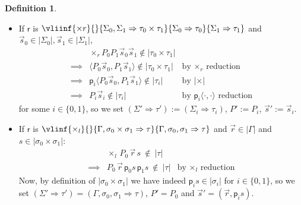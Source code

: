 \documentclass[10pt,a4paper]{amsart}
\theoremstyle{plain}
\theoremstyle{definition}
\newtheorem{definition}[definition]{Definition}
\theoremstyle{plain}
\theoremstyle{definition} %
\renewcommand{\succ}{\mathsf s}
\newcommand{\numeral}[1]{\underline{#1}}
\newcommand{\nat}{\mathit{N}}
\newcommand{\N}{\nat} %
\newcommand{\seqar}{\Rightarrow}
\newcommand{\Ncnd}{\lr \N'}
\newcommand{\infrule}{\mathsf{r}}
\newcommand{\rrule}{\infrule} %
\newcommand{\pair}[2]{\langle #1,#2\rangle}
\newcommand{\lr}[1]{#1_l}
\newcommand{\rr}[1]{#1_r}
\newcommand{\proj}[1]{\mathsf{p}_{#1}}
\newcommand{\der}{P}
\newcommand{\hr}[1]{|#1|}
\begin{document}
\begin{definition}
\begin{itemize}
Otherwise if $n= n'+1$ then,
\[
\begin{array}{rll}
     & \Ncnd \der_0 \der_1 \vec s s \, \notin \hr \tau \\
     \implies & \Ncnd \der_0  \der_1 \vec s  (\succ \numeral n') \, \notin \hr \tau & \text{by closure under conversion} \\
     \implies & \der_1  \vec s \numeral n' \, \notin \hr \tau & \text{by $\Ncnd$ reduction}
\end{array}
\]
so we set $(\Sigma'\seqar \tau'):= (\Sigma_0, \nat \seqar \tau)$, $\der':= \der_1$, $\vec s' := (\vec s,\numeral n')$.
        \item If $\rrule$ is
        \(
        \vliinf{\times r }{}{\Sigma_0, \Sigma_1 \seqar \tau_0 \times \tau_1}{\Sigma_0 \seqar \tau_0}{\Sigma_1 \seqar \tau_1}
        \)
        and $\vec s_0 \in \hr{\Sigma_0}, \vec s_1 \in \hr{\Sigma_1}$,
        \[
        \begin{array}{rll}
        & {\rr \times} {\der_0}{\der_1}\vec s_0 \vec s_1 \notin \hr{\tau_0\times \tau_1} & 
        \\ 
        \implies & \pair{\der_0\vec s_0}{\der_1\vec s_1} \notin\hr{\tau_0\times \tau_1} & \text{by $\rr\times$ reduction} \\
        \implies & \proj i \pair{\der_0\vec s_0}{\der_1\vec s_1}  \notin \hr{\tau_i} & \text{by $\hr{\times}$} \\
        \implies & {\der_i}\vec s_i \notin \hr{\tau_i} & \text{by {$\proj i \pair{\cdot}{\cdot}$ reduction}}
        \end{array}
        \]
        for some $i\in \{0,1\}$,
        so we set $(\Sigma' \seqar \tau') := (\Sigma_i \seqar \tau_i)$, $\der' := \der_i$, $\vec s' := \vec s_i$.
    \item If $\rrule$ is $\vlinf{  {\lr \times}}{}{\Gamma, \sigma_0 \times \sigma_1 \seqar \tau  }{\Gamma, \sigma_0,\sigma_1 \seqar \tau}$ and $\vec r \in \hr{\Gamma}$ and $s \in \hr{\sigma_0 \times \sigma_1}$:
    \[
    \begin{array}{rll}
        & {\lr\times }\,  {\der_0}\,  \vec r \, s\ \notin\  \hr\tau & 
        \\
        \implies & {\der_0}\, \vec r \, \proj 0 s\, \proj 1 s \ \notin\  \hr\tau & \text{by $\lr \times$ reduction}
    \end{array}
    \]
    Now, by definition of $\hr{\sigma_0 \times \sigma_1}$ we have indeed $\proj i s \in \hr{\sigma_i}$ for $i\in \{0,1\}$,
    so we set $(\Sigma' \seqar \tau') = (\Gamma,\sigma_0,\sigma_1 \seqar \tau)$, $\der' = \der_0$ and $\vec s' = (\vec r, \proj i s)$.

\end{itemize}
\end{definition}
\end{document}
